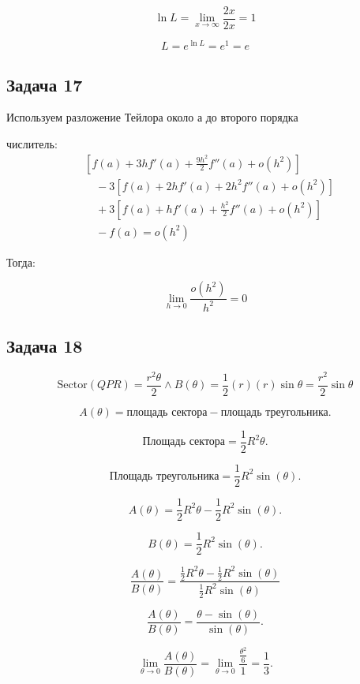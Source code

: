 \documentclass[a4paper,12pt]{article}
\begin{document}
\[
\ln L = \lim_{x \to \infty} \frac{2x}{2x} = 1
\]

\[
L = e^{\ln L} = e^1 = e
\]

\subsection{Задача 17}
Используем разложение Тейлора около а до второго порядка

числитель:
\begin{align*}
    &\left[ f(a) + 3h f'(a) + \frac{9h^2}{2} f''(a) + o(h^2) \right] \\
    &\quad - 3\left[ f(a) + 2h f'(a) + 2h^2 f''(a) + o(h^2) \right] \\
    &\quad + 3\left[ f(a) + h f'(a) + \frac{h^2}{2} f''(a) + o(h^2) \right] \\
    &\quad - f(a) = o(h^2)
\end{align*}

Тогда:

\[
    \lim_{h \to 0} \frac{o(h^2)}{h^2} = 0
\]

\subsection{Задача 18}
\[
\text{Sector}(QPR) = \frac{r^2 \theta}{2} \land B(\theta) = \frac{1}{2} (r)(r)\sin\theta = \frac{r^2}{2}\sin\theta
\]

\[
    A(\theta) = \text{площадь сектора} - \text{площадь треугольника}.
\]

\[
    \text{Площадь сектора} = \frac{1}{2} R^2 \theta.
\]

\[
    \text{Площадь треугольника} = \frac{1}{2} R^2 \sin(\theta).
\]

\[
    A(\theta) = \frac{1}{2} R^2 \theta - \frac{1}{2} R^2 \sin(\theta).
\]

\[
    B(\theta) = \frac{1}{2} R^2 \sin(\theta).
\]

\[
    \frac{A(\theta)}{B(\theta)} = \frac{\frac{1}{2} R^2 \theta - \frac{1}{2} R^2 \sin(\theta)}{\frac{1}{2} R^2 \sin(\theta)}
\]

\[
    \frac{A(\theta)}{B(\theta)} = \frac{\theta - \sin(\theta)}{\sin(\theta)}.
\]

\[
    \lim_{\theta \to 0} \frac{A(\theta)}{B(\theta)} = \lim_{\theta \to 0} \frac{\frac{\theta^2}{6}}{1} = \frac{1}{3}.
\]
\end{document}
